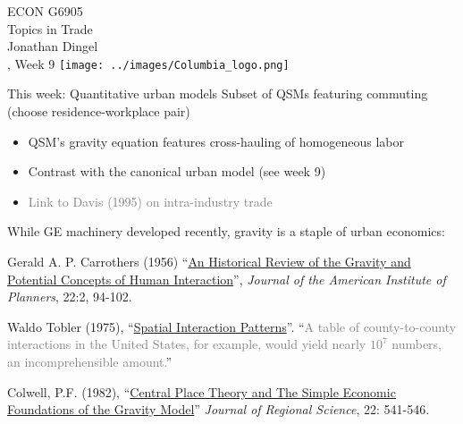 \documentclass[11pt,notes=hide,aspectratio=169]{beamer}
\begin{document}
\begin{frame}[plain]
\begin{center}
\large
\textcolor{columbiadarkblue}{ECON G6905\\
Topics in Trade\\ 
Jonathan Dingel\\
\semester, Week 9}
\vfill 
\texttt{[image: ../images/Columbia\_logo.png]}
\end{center}
\end{frame}
\begin{frame}{This week: Quantitative urban models}
Subset of QSMs featuring commuting (choose residence-workplace pair)
\begin{itemize}
\item QSM's gravity equation features cross-hauling of homogeneous labor
\item Contrast with the canonical urban model (see week 9)\\
\item[] \textcolor{gray}{Link to Davis (1995) on intra-industry trade}
\end{itemize}
\smallskip
While GE machinery developed recently, gravity is a staple of urban economics:
\begin{itemize}{\small
\item Gerald A. P. Carrothers (1956) ``\href{https://doi.org/10.1080/01944365608979229}{An Historical Review of the Gravity and Potential Concepts of Human Interaction}'', \textit{Journal of the American Institute of Planners}, 22:2, 94-102.
\item Waldo Tobler (1975), ``\href{https://pure.iiasa.ac.at/id/eprint/241/1/RR-75-019.pdf}{Spatial Interaction Patterns}''. ``\textcolor{gray}{A table of county-to-county interactions in the United States, for example, would yield nearly $10^7$ numbers, an incomprehensible amount.}''
\item Colwell, P.F. (1982), ``\href{https://doi.org/10.1111/j.1467-9787.1982.tb00775.x}{Central Place Theory and The Simple Economic Foundations of the Gravity Model}'' \textit{Journal of Regional Science}, 22: 541-546.
}\end{itemize}
\end{frame}
\end{document}
